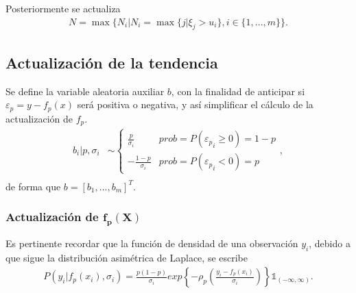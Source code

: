 Posteriormente se actualiza
\begin{equation*}
\begin{aligned}
   N = \max\{
    N_i|N_i=\max\{j|\xi_j > u_i\}, 
    i \in \{1,...,m\}
   \}.
\end{aligned}
\end{equation*}

\subsection{Actualizaci\'on de la tendencia}

Se define la variable aleatoria auxiliar $b$, con la finalidad de anticipar si $\varepsilon_p = y - f_p(x)$ ser\'a positiva o negativa, y as\'i simplificar el c\'alculo de la actualizaci\'on de $f_p$.
\begin{equation*}
\begin{aligned}
    b_i | p, \sigma_i &\sim 
    \begin{cases}
        \frac{p}{\sigma_i} &prob = P({\varepsilon_p}_i \geq 0) = 1-p\\
        -\frac{1-p}{\sigma_i} &prob = P({\varepsilon_p}_i < 0) = p
    \end{cases},\\
\end{aligned}
\end{equation*}
de forma que $b = [b_1,...,b_m]^T$. 

\subsubsection{Actualizaci\'on de $\bm{f_p(X)}$}

Es pertinente recordar que la funci\'on de densidad de una observaci\'on $y_i$, debido a que sigue la distribuci\'on asim\'etrica de Laplace, se escribe
\begin{equation*}
\begin{aligned}
    P(y_i | f_p(x_i),\sigma_i) = 
    \frac{p(1-p)}{\sigma_i}
    exp \left\{-\rho_p
        \left(
            \frac{y_i-f_p(x_i)}{\sigma_i}
        \right)
    \right\}
    \mathds{1}_{(-\infty,\infty)}.
\end{aligned}
\end{equation*}

